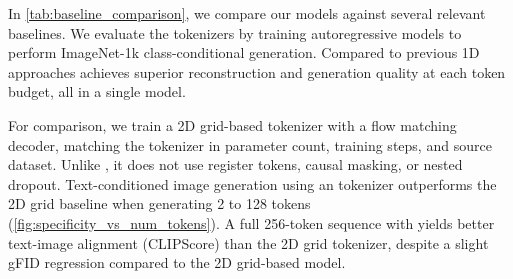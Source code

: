 In \cref{tab:baseline_comparison}, we compare our \ours models against several relevant baselines. We evaluate the tokenizers by training autoregressive models to perform ImageNet-1k class-conditional generation. Compared to previous 1D approaches \ours achieves superior reconstruction and generation quality at each token budget, all in a single model.

For comparison, we train a 2D grid-based tokenizer with a flow matching decoder, matching the \oursxlarge tokenizer in parameter count, training steps, and source dataset. Unlike \oursxlarge, it does not use register tokens, causal masking, or nested dropout. Text-conditioned image generation using an \ours tokenizer outperforms the 2D grid baseline when generating 2 to 128 tokens (\cref{fig:specificity_vs_num_tokens}). A full 256-token sequence with \ours yields better text-image alignment (CLIPScore) than the 2D grid tokenizer, despite a slight gFID regression compared to the 2D grid-based model.

